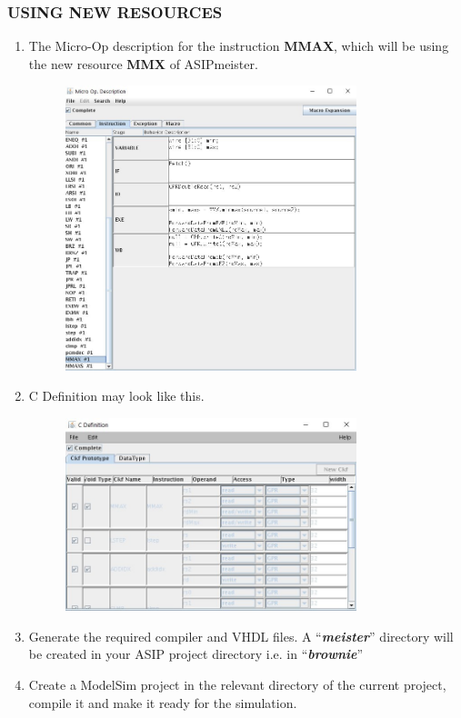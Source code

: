 \subsubsection{USING NEW RESOURCES}
\begin{enumerate}[resume]
\item The Micro-Op description for the instruction \textbf{MMAX}, which will
be using the new resource \textbf{MMX} of ASIPmeister.
\begin{figure}[!htb]
	\centering
	\includegraphics[width=0.8\textwidth]{src/images/image4.jpg}
	\caption{}
	\label{fig:fig4}
\end{figure}
\item C Definition may look like this.
\begin{figure}[!htb]
	\centering
	\includegraphics[width=0.8\textwidth]{src/images/image5.jpg}
	\caption{}
	\label{fig:fig5}
\end{figure}
\item Generate the required compiler and VHDL files. A
``\emph{\textbf{meister}}'' directory will be created in your ASIP
project directory i.e. in ``\emph{\textbf{brownie}}''
\item Create a ModelSim project in the relevant directory of the current
project, compile it and make it ready for the simulation.
\end{enumerate}
